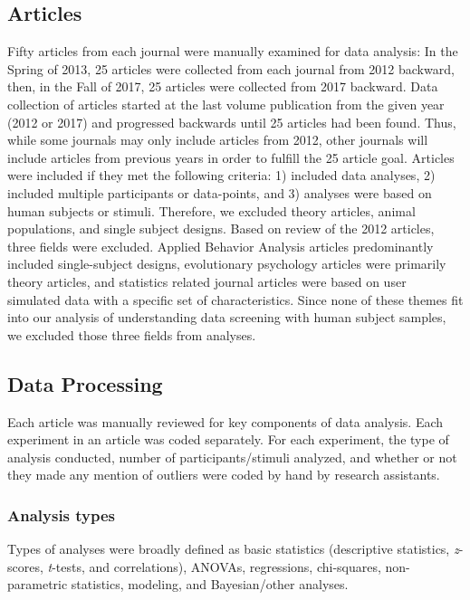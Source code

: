 \documentclass[english,,man,mask]{apa6}
\theoremstyle{definition}
\theoremstyle{definition}
\theoremstyle{definition}
\theoremstyle{remark}
\begin{document}
\subsection{Articles}\label{articles}

Fifty articles from each journal were manually examined for data
analysis: In the Spring of 2013, 25 articles were collected from each
journal from 2012 backward, then, in the Fall of 2017, 25 articles were
collected from 2017 backward. Data collection of articles started at the
last volume publication from the given year (2012 or 2017) and
progressed backwards until 25 articles had been found. Thus, while some
journals may only include articles from 2012, other journals will
include articles from previous years in order to fulfill the 25 article
goal. Articles were included if they met the following criteria: 1)
included data analyses, 2) included multiple participants or
data-points, and 3) analyses were based on human subjects or stimuli.
Therefore, we excluded theory articles, animal populations, and single
subject designs. Based on review of the 2012 articles, three fields were
excluded. Applied Behavior Analysis articles predominantly included
single-subject designs, evolutionary psychology articles were primarily
theory articles, and statistics related journal articles were based on
user simulated data with a specific set of characteristics. Since none
of these themes fit into our analysis of understanding data screening
with human subject samples, we excluded those three fields from
analyses.

\subsection{Data Processing}\label{data-processing}

Each article was manually reviewed for key components of data analysis.
Each experiment in an article was coded separately. For each experiment,
the type of analysis conducted, number of participants/stimuli analyzed,
and whether or not they made any mention of outliers were coded by hand
by research assistants.

\subsubsection{Analysis types}\label{analysis-types}

Types of analyses were broadly defined as basic statistics (descriptive
statistics, \emph{z}-scores, \emph{t}-tests, and correlations), ANOVAs,
regressions, chi-squares, non-parametric statistics, modeling, and
Bayesian/other analyses.
\end{document}
